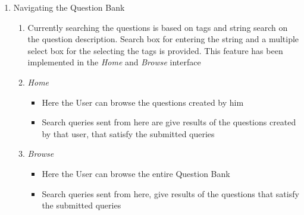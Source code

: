 \documentclass[a4paper,12pt,oneside]{book}
\begin{document}
\begin{enumerate}
        \item Navigating the Question Bank 
            \begin{enumerate}
                \item Currently searching the questions is based on tags and string search on the question description. Search box for entering the string and a multiple select box for the selecting the tags is provided. This feature has been implemented in the \textit{Home} and \textit{Browse} interface
                
                \item \textit{Home}
                    \begin{itemize}
                      \item Here the User can browse the questions created by him 
                      \item Search queries sent from here are give results of the questions created by that user, that satisfy the submitted queries
                    \end{itemize}
                    
                \item \textit{Browse}
                    \begin{itemize}
                      \item Here the User can browse the entire Question Bank  
                      \item Search queries sent from here, give results of the questions that satisfy the submitted queries
                    \end{itemize}
            \end{enumerate}
            

\end{enumerate}
\end{document}
